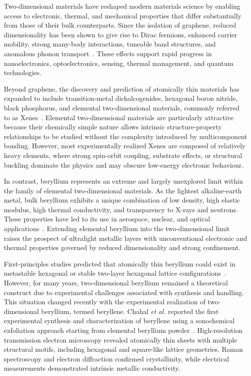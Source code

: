 Two-dimensional materials have reshaped modern materials science by enabling access to electronic,
thermal,
and mechanical properties that differ substantially from those of their bulk counterparts.
Since the isolation of graphene,
reduced dimensionality has been shown to give rise to Dirac fermions,
enhanced carrier mobility,
strong many-body interactions,
tuneable band structures,
and anomalous phonon transport~\cite{novoselov2004electric,geim2007rise}.
These effects support rapid progress in nanoelectronics,
optoelectronics,
sensing,
thermal management,
and quantum technologies.

Beyond graphene,
the discovery and prediction of atomically thin materials has expanded to include transition-metal dichalcogenides,
hexagonal boron nitride,
black phosphorus,
and elemental two-dimensional materials,
commonly referred to as Xenes~\cite{butler2013progress,molle2018silicene}.
Elemental two-dimensional materials are particularly attractive because their chemically simple nature allows intrinsic structure-property relationships to be studied without the complexity introduced by multicomponent bonding.
However,
most experimentally realized Xenes are composed of relatively heavy elements,
where strong spin-orbit coupling,
substrate effects,
or structural buckling dominate the physics and may obscure low-energy electronic behaviour.

In contrast,
beryllium represents an extreme and largely unexplored limit within the family of elemental two-dimensional materials.
As the lightest alkaline-earth metal,
bulk beryllium exhibits a unique combination of low density,
high elastic modulus,
high thermal conductivity,
and transparency to X-rays and neutrons.
These properties have led to its use in aerospace,
nuclear,
and optical applications~\cite{zheng2020progress}.
Extending elemental beryllium into the two-dimensional limit raises the prospect of ultralight metallic layers with unconventional electronic and thermal properties governed by reduced dimensionality and strong confinement.

First-principles studies predicted that atomically thin beryllium could exist in metastable hexagonal or stable two-layer hexagonal lattice configurations~\cite{ono2020dynamical,hess2022periodicity}.
However,
for many years,
two-dimensional beryllium remained a theoretical construct due to experimental challenges associated with synthesis and handling.
This situation changed recently with the experimental realization of two-dimensional beryllium,
termed beryllene.
Chahal \textit{et al.} reported the first experimental synthesis and characterization of beryllene using a sonochemical exfoliation approach starting from elemental beryllium powder~\cite{chahal2023beryllene}.
High-resolution transmission electron microscopy revealed atomically thin sheets with multiple structural motifs,
including hexagonal and square-like lattice geometries.
Raman spectroscopy and electron diffraction confirmed crystallinity,
while electrical measurements demonstrated intrinsic metallic conductivity.

